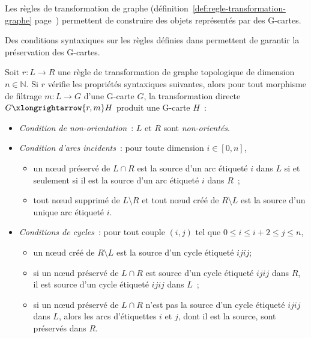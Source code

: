 
Les règles de transformation de graphe (définition~\ref{def:regle-transformation-graphe} page~\pageref{def:regle-transformation-graphe}) permettent de construire des objets représentés par des G-cartes.

Des conditions syntaxiques sur les règles définies dans
\cite{poudr2009,pascual2022topological} permettent de garantir la préservation
des G-cartes. %

\begin{theoreme}
	\label{thm:preservation-coherence-topo-gcarte}
	Soit $r : L \longrightarrow R$ une règle de transformation de graphe topologique de dimension $n \in \mathbb{N}$. Si $r$
	vérifie les propriétés syntaxiques suivantes, alors pour tout morphisme de
	filtrage $m : L \to G$ d'une G-carte $G$, la transformation directe
	$G \xlongrightarrow{r,m} H$ produit une G-carte $H$~:


	\begin{itemize}
		\item \emph{Condition de non-orientation}~: $L$ et $R$ sont
		      \emph{non-orientés}.
		\item \emph{Condition d'arcs incidents}~: pour toute dimension
		      $i \in [0,n]$,
		      \begin{itemize}
			      \item un n\oe ud préservé de $L \cap R$ est la source d'un arc
			            étiqueté $i$ dans $L$ si et seulement si il est la source
			            d'un arc étiqueté $i$ dans $R$~;
			      \item tout n\oe ud supprimé de $L \setminus R$ et tout n\oe ud créé de $R \setminus L$
			            est la source d'un unique arc étiqueté $i$.
		      \end{itemize}
		\item \emph{Conditions de cycles}~: pour tout couple $(i,j)$ tel que
		      $0 \leq i \leq i + 2 \leq j \leq n$,
		      \begin{itemize}
			      \item un n\oe ud créé de $R \setminus L$ est la source d'un cycle étiqueté
			            $ijij$;
			      \item si un n\oe ud préservé de $L \cap R$ est source d'un cycle
			            étiqueté $ijij$ dans $R$, il est source d'un cycle
			            étiqueté $ijij$ dans $L$~;
			      \item si un n\oe ud préservé de $L \cap R$ n'est pas la source d'un
			            cycle étiqueté $ijij$ dans $L$, alors les arcs
			            d'étiquettes $i$ et $j$, dont il est la source, sont
			            préservés dans $R$.
		      \end{itemize}
	\end{itemize}
\end{theoreme}

